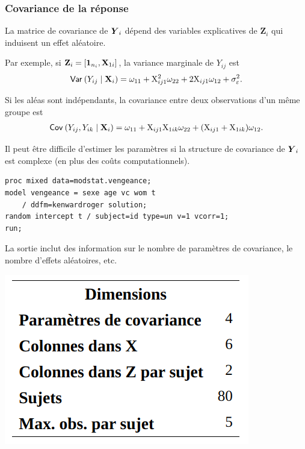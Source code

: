\documentclass{beamer}
\begin{document}
\begin{frame}
\frametitle{Covariance de la réponse}
\bi
\item La matrice de covariance de $\boldsymbol {Y}_{i}$ dépend des variables explicatives de $\mathbf{Z}_i$ qui induisent un effet aléatoire.
\item Par exemple, si $\mathbf{Z}_{i} = [\boldsymbol {1}_{n_i}, \mathbf{X}_{1i}]$, la variance marginale de $Y_{ij}$ est
\begin{align*}
{\mathsf{Var}_{}}\left(Y_{ij}\mid \mathbf{X}_i\right)=\omega_{11}+\mathrm{X}_{ij1}^2 \omega_{22} + 2\mathrm{X}_{ij1} \omega_{12}+\sigma^2_{\varepsilon}.
\end{align*}
\item Si les aléas sont indépendants, la covariance entre deux observations d'un même groupe est 
\begin{align*}
{\mathsf{Cov}_{}}\left(Y_{ij}, Y_{ik}\mid \mathbf{X}_i\right)=\omega_{11}+\mathrm{X}_{ij1}\mathrm{X}_{1ik}\omega_{22}+(\mathrm{X}_{ij1}+\mathrm{X}_{1ik})\omega_{12}.
\end{align*}
\item Il peut être difficile d'estimer les paramètres si la structure de covariance de $\boldsymbol {Y}_i$ est complexe (en plus des coûts computationnels).
\ei
\end{frame}

\begin{frame}[fragile]
\begin{tcolorbox}[colback=white, colframe=hecblue, title=Code \SASlang{} pour ajuste un modèle avec pente aléatoire]
\begin{verbatim}
proc mixed data=modstat.vengeance;
model vengeance = sexe age vc wom t 
    / ddfm=kenwardroger solution;
random intercept t / subject=id type=un v=1 vcorr=1;
run;
\end{verbatim}
\end{tcolorbox}
La sortie inclut des information sur le nombre de paramètres de covariance, le nombre d'effets aléatoires, etc.
\begin{center}
\includegraphics[width = 0.35\linewidth]{img/c6/diapos7-e23}
\end{center}
\end{frame}
%  
\end{document}
